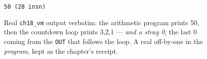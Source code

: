 \begin{figure}[htbp]
\centering
\texttt{50     \quad (28 insn)}
\caption{Real \texttt{ch18\_vm} output verbatim: the arithmetic
program prints 50, then the countdown loop prints 3,2,1 ---
\emph{and a stray 0}, the last 0 coming from the \texttt{OUT} that follows the loop.
A real off-by-one in the \emph{program}, kept as the chapter's receipt.}
\label{fig:vmrun18}
\end{figure}
